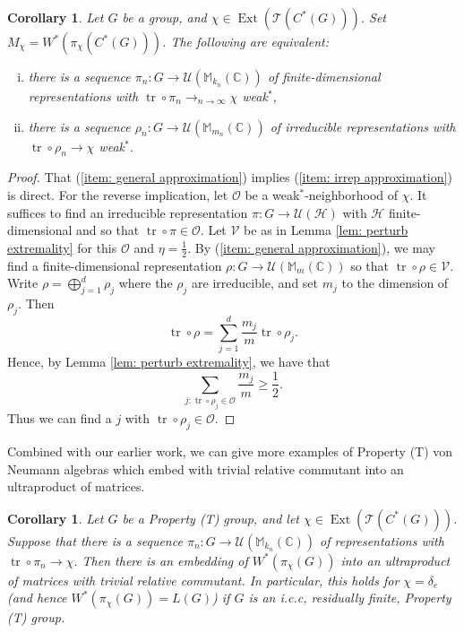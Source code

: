 \documentclass[10pt]{amsart}
\newtheorem{cor}[thm]{Corollary}
\theoremstyle{definition}
\numberwithin{equation}{section}
\newcommand{\bC}{{\mathbb C}}
\newcommand{\bM}{{\mathbb M}}
\newcommand{\cH}{{\mathcal H}}
\newcommand{\cT}{{\mathcal T}}
\newcommand{\cU}{{\mathcal U}}
\DeclareMathOperator{\tr}{tr}
\DeclareMathOperator{\Ext}{Ext}
\begin{document}
\begin{cor}\label{cor:removing irrep assumption}
Let $G$ be a group, and $\chi\in \Ext(\cT(C^{*}(G)))$. Set $M_{\chi}=W^{*}(\pi_{\chi}(C^{*}(G)))$. The following are equivalent:
\begin{enumerate}[(i)]
    \item there is a sequence $\pi_{n}\colon G\to \cU(\bM_{k_{n}}(\bC))$ of finite-dimensional representations with $\tr\circ \pi_{n}\to_{n\to\infty}\chi$ weak$^{*}$, \label{item: irrep approximation}
    \item there is a sequence $\rho_{n}\colon G\to \cU(\bM_{m_{n}}(\bC))$ of irreducible representations with $\tr\circ \rho_{n}\to \chi$ weak$^{*}$. \label{item: general approximation}
\end{enumerate}
\end{cor}

\begin{proof}
That (\ref{item: general approximation}) implies (\ref{item: irrep approximation}) is direct. For the reverse implication, let $\mathcal{O}$ be a weak$^{*}$-neighborhood of $\chi$. It suffices to find an irreducible representation $\pi\colon G\to \cU(\cH)$ with $\cH$ finite-dimensional and so that $\tr\circ \pi\in \mathcal{O}$. Let $\mathcal{V}$ be as in Lemma \ref{lem: perturb extremality} for this $\mathcal{O}$ and $\eta=\frac{1}{2}$. By (\ref{item: general approximation}), we may find a finite-dimensional representation $\rho\colon G\to \cU(\bM_{m}(\bC))$ so that $\tr\circ \rho\in \mathcal{V}$. Write $\rho=\bigoplus_{j=1}^{d}\rho_{j}$ where the $\rho_{j}$ are irreducible, and set $m_{j}$ to the dimension of $\rho_{j}$. Then
\[\tr\circ \rho=\sum_{j=1}^{d}\frac{m_{j}}{m}\tr\circ \rho_{j}.\]
Hence, by Lemma \ref{lem: perturb extremality}, we have that 
\[\sum_{j:\tr\circ\rho_{j}\in \mathcal{O}}\frac{m_{j}}{m}\geq \frac{1}{2}.\]
Thus we can find a $j$ with $\tr\circ\rho_{j}\in \mathcal{O}$.
\end{proof}

Combined with our earlier work, we can give more examples of Property (T) von Neumann algebras which embed with trivial relative commutant into an ultraproduct of matrices.

\begin{cor}
Let $G$ be a Property (T) group, and let $\chi\in\Ext(\cT(C^{*}(G)))$. Suppose that there is a sequence $\pi_{n}\colon G\to \cU(\bM_{k_{n}}(\bC))$ of representations with $\tr\circ\pi_{n}\to \chi$. Then there is an embedding of $W^{*}(\pi_{\chi}(G))$ into an ultraproduct of matrices with trivial relative commutant. In particular, this holds for $\chi=\delta_{e}$ (and hence $W^{*}(\pi_{\chi}(G))=L(G)$)  if $G$ is an i.c.c, residually finite, Property (T) group.  
\end{cor}
\end{document}
